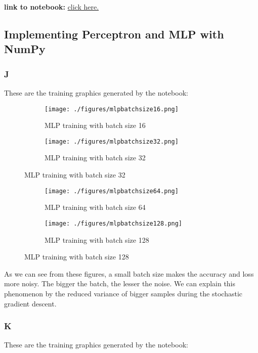 \documentclass[12pt]{article}
\theoremstyle{definition}
\begin{document}
\textbf{link to notebook:} \href{https://colab.research.google.com/drive/1473s94Jv_ti1Hddf0_Hh1R136zOeYhTv?usp=sharing}{click here.}
\vspace{0.2cm}
\subsection{Implementing Perceptron and MLP with NumPy}

\subsubsection*{J} These are the training graphics generated by the notebook:

\begin{figure}[H]
  \centering
  \begin{subfigure}[b]{0.45\textwidth}
    \centering
    \texttt{[image: ./figures/mlpbatchsize16.png]}
    \caption{MLP training with batch size 16}
  \end{subfigure}
  \hfill
  \begin{subfigure}[b]{0.45\textwidth}
    \centering
    \texttt{[image: ./figures/mlpbatchsize32.png]}
    \caption{MLP training with batch size 32}
  \end{subfigure}
\end{figure}

\begin{figure}[H]
  \centering
  \begin{subfigure}[b]{0.45\textwidth}
    \centering
    \texttt{[image: ./figures/mlpbatchsize64.png]}
    \caption{MLP training with batch size 64}
  \end{subfigure}
  \hfill
  \begin{subfigure}[b]{0.45\textwidth}
    \centering
    \texttt{[image: ./figures/mlpbatchsize128.png]}
    \caption{MLP training with batch size 128}
  \end{subfigure}
\end{figure}
As we can see from these figures, a small batch size makes the accuracy and loss
more noisy. The bigger the batch, the lesser the noise. We can explain this
phenomenon by the reduced variance of bigger samples during the stochastic gradient descent.

\subsubsection*{K} These are the training graphics generated by the notebook:
\end{document}
